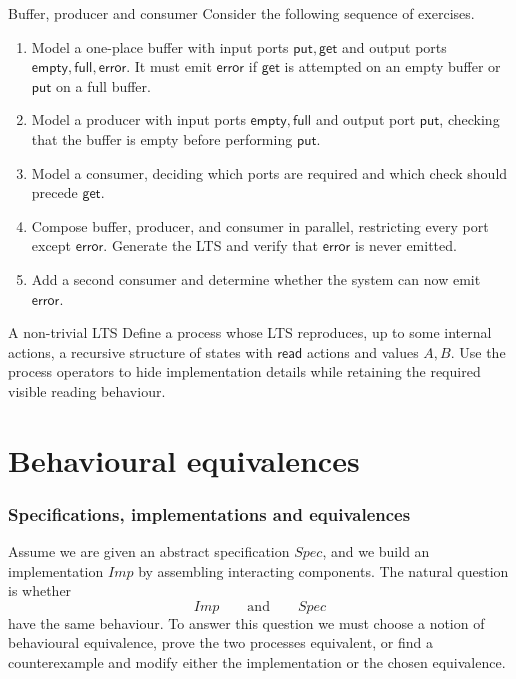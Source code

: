 \documentclass[a4paper]{article}
\begin{document}
\begin{snippetexercise}{Buffer, producer and consumer}
    Consider the following sequence of exercises.
    \begin{enumerate}
        \item Model a one-place buffer with input ports \(\mathsf{put},\mathsf{get}\) and output ports \(\mathsf{empty},\mathsf{full},\mathsf{error}\). It must emit \(\mathsf{error}\) if \(\mathsf{get}\) is attempted on an empty buffer or \(\mathsf{put}\) on a full buffer.
        \item Model a producer with input ports \(\mathsf{empty},\mathsf{full}\) and output port \(\mathsf{put}\), checking that the buffer is empty before performing \(\mathsf{put}\).
        \item Model a consumer, deciding which ports are required and which check should precede \(\mathsf{get}\).
        \item Compose buffer, producer, and consumer in parallel, restricting every port except \(\mathsf{error}\). Generate the LTS and verify that \(\mathsf{error}\) is never emitted.
        \item Add a second consumer and determine whether the system can now emit \(\mathsf{error}\).
    \end{enumerate}
\end{snippetexercise}

\begin{snippetexercise}{A non-trivial LTS}
    Define a process whose LTS reproduces, up to some internal actions, a recursive structure of states with \(\mathsf{read}\) actions and values \(A,B\).
    Use the process operators to hide implementation details while retaining the required visible reading behaviour.
\end{snippetexercise}

\pagebreak
\part{Behavioural equivalences}

\section{Specifications, implementations and equivalences}

Assume we are given an abstract specification \(\mathit{Spec}\), and we build an implementation \(\mathit{Imp}\) by assembling interacting components.
The natural question is whether
\[
    \mathit{Imp}
    \qquad\text{and}\qquad
    \mathit{Spec}
\]
have the same behaviour.
To answer this question we must choose a notion of behavioural equivalence, prove the two processes equivalent, or find a counterexample and modify either the implementation or the chosen equivalence.
\end{document}
